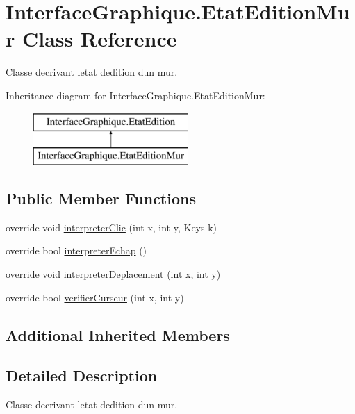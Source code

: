 \hypertarget{class_interface_graphique_1_1_etat_edition_mur}{}\section{Interface\+Graphique.\+Etat\+Edition\+Mur Class Reference}
\label{class_interface_graphique_1_1_etat_edition_mur}


Classe decrivant l\textquotesingle{}etat d\textquotesingle{}edition d\textquotesingle{}un mur.  


Inheritance diagram for Interface\+Graphique.\+Etat\+Edition\+Mur\+:\begin{figure}[H]
\begin{center}
\leavevmode
\includegraphics[height=2.000000cm]{class_interface_graphique_1_1_etat_edition_mur}
\end{center}
\end{figure}
\subsection*{Public Member Functions}
\begin{DoxyCompactItemize}
\item 
override void \hyperlink{group__inf2990_gad13a89d6605d4326b0080215502a5fb2}{interpreter\+Clic} (int x, int y, Keys k)
\item 
override bool \hyperlink{group__inf2990_ga8d021b397d9ebd210158236d43df2207}{interpreter\+Echap} ()
\item 
override void \hyperlink{group__inf2990_ga71cbbc58a1d9770318042607ccf474c1}{interpreter\+Deplacement} (int x, int y)
\item 
override bool \hyperlink{group__inf2990_gafcbf611bc57ec2c40d6c9d4851b8f832}{verifier\+Curseur} (int x, int y)
\end{DoxyCompactItemize}
\subsection*{Additional Inherited Members}


\subsection{Detailed Description}
Classe decrivant l\textquotesingle{}etat d\textquotesingle{}edition d\textquotesingle{}un mur. 

